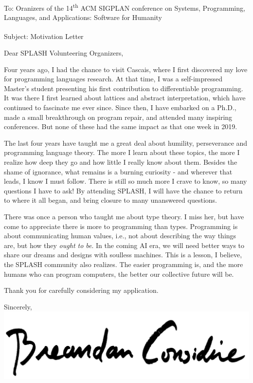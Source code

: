 \documentclass{letter}
\begin{document}
    \begin{letter}{To: Oranizers of the 14\textsuperscript{th} ACM SIGPLAN conference on Systems, Programming, Languages, and Applications: Software for Humanity\\\phantom{.}\\Subject: Motivation Letter\\}
        \opening{Dear SPLASH Volunteering Organizers,}
        Four years ago, I had the chance to visit Cascais, where I first discovered my love for programming languages research. At that time, I was a self-impressed Master’s student presenting his first contribution to differentiable programming. It was there I first learned about lattices and abstract interpretation, which have continued to fascinate me ever since. Since then, I have embarked on a Ph.D., made a small breakthrough on program repair, and attended many inspiring conferences. But none of these had the same impact as that one week in 2019.

        The last four years have taught me a great deal about humility, perseverance and programming language theory. The more I learn about these topics, the more I realize how deep they go and how little I really know about them. Besides the shame of ignorance, what remains is a burning curiosity - and wherever that leads, I know I must follow. There is still so much more I crave to know, so many questions I have to ask! By attending SPLASH, I will have the chance to return to where it all began, and bring closure to many unanswered questions.

        There was once a person who taught me about type theory. I miss her, but have come to appreciate there is more to programming than types. Programming is about communicating human values, i.e., not about describing the way things are, but how they \textit{ought to be}. In the coming AI era, we will need better ways to share our dreams and designs with soulless machines. This is a lesson, I believe, the SPLASH community also realizes. The easier programming is, and the more humans who can program computers, the better our collective future will be.

        Thank you for carefully considering my application.

        \closing{Sincerely,\\
        \includegraphics[scale=0.06]{signature}\\
        }
    \end{letter}
\end{document}
